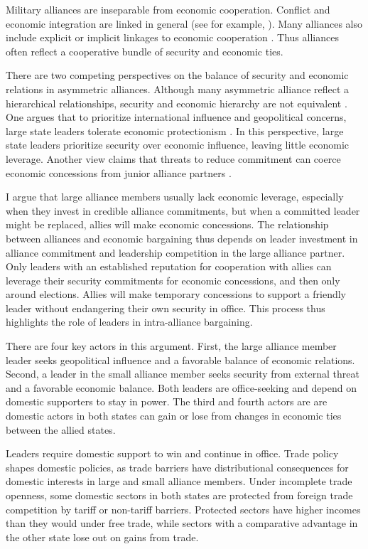 \documentclass[12pt]{article}
\begin{document}
Military alliances are inseparable from economic cooperation.
Conflict and economic integration are linked in general (see for example, \citep{GartzkeLi2003, Chen2021}).
Many alliances also include explicit or implicit linkages to economic cooperation \citep{GowaMansfield2004, LongLeeds2006, Davis2008, Poast2012}. 
Thus alliances often reflect a cooperative bundle of security and economic ties. 


There are two competing perspectives on the balance of security and economic relations in asymmetric alliances.
Although many asymmetric alliance reflect a hierarchical relationships, security and economic hierarchy are not equivalent \citep{Lake2009}. 
One argues that to prioritize international influence and geopolitical concerns, large state leaders tolerate economic protectionism \citep{Drezner2013, WolfordKim2017}. 
In this perspective, large state leaders prioritize security over economic influence, leaving little economic leverage. 
Another view claims that threats to reduce commitment can coerce economic concessions from junior alliance partners \citep{Oatley2015}.  


I argue that large alliance members usually lack economic leverage, especially when they invest in credible alliance commitments, but when a committed leader might be replaced, allies will make economic concessions. 
The relationship between alliances and economic bargaining thus depends on leader investment in alliance commitment and leadership competition in the large alliance partner.  
Only leaders with an established reputation for cooperation with allies can leverage their security commitments for economic concessions, and then only around elections. 
Allies will make temporary concessions to support a friendly leader without endangering their own security in office. 
This process thus highlights the role of leaders in intra-alliance bargaining. 


There are four key actors in this argument. 
First, the large alliance member leader seeks geopolitical influence and a favorable balance of economic relations. 
Second, a leader in the small alliance member seeks security from external threat and a favorable economic balance.
Both leaders are office-seeking and depend on domestic supporters to stay in power.
The third and fourth actors are are domestic actors in both states can gain or lose from changes in economic ties between the allied states. 


Leaders require domestic support to win and continue in office.
Trade policy shapes domestic policies, as trade barriers have distributional consequences for domestic interests in large and small alliance members.
Under incomplete trade openness, some domestic sectors in both states are protected from foreign trade competition by tariff or non-tariff barriers. 
Protected sectors have higher incomes than they would under free trade, while sectors with a comparative advantage in the other state lose out on gains from trade. 
\end{document}
